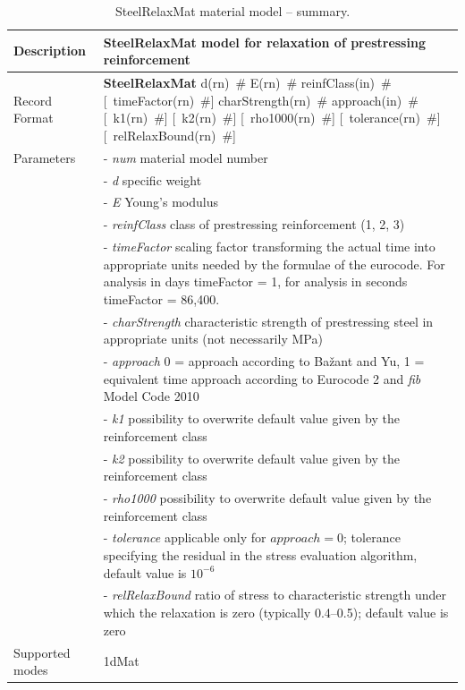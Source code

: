 \documentclass[a4paper]{article}
\newcommand{\descitem}[1]{{\noindent \bf #1}}
\newcommand{\elemparam}[2]{{{#1\tiny (#2)}~\#}}
\newcommand{\optelemparam}[2]{[{~\elemparam{#1}{#2}}]}
\newcommand{\param}[1]{{\it #1}}
\newenvironment{mmt}{\begin{tabular}{|l|p{9cm}|}}{\end{tabular}\\}
\newenvironment{mmt}{\begin{tabular}{|l|l|}}{\end{tabular}\\}
\begin{document}
\begin{table}[!htb]
\begin{mmt}
\hline
Description & SteelRelaxMat model for relaxation of prestressing reinforcement\\
\hline
Record Format & \descitem{SteelRelaxMat}  
\elemparam{d}{rn}
\elemparam{E}{rn}
\elemparam{reinfClass}{in}
\optelemparam{timeFactor}{rn}
\elemparam{charStrength}{rn} 
\elemparam{approach}{in} 
\optelemparam{k1}{rn}
\optelemparam{k2}{rn}
\optelemparam{rho1000}{rn}
\optelemparam{tolerance}{rn}
\optelemparam{relRelaxBound}{rn}\\
Parameters &- \param{num} material model number\\
&- \param{d} specific weight\\
&- \param{E} Young's modulus \\
&- \param{reinfClass} class of prestressing reinforcement (1, 2, 3) \\
&- \param{timeFactor} scaling factor transforming the actual time into
appropriate units needed by the formulae of the eurocode. For analysis
in days timeFactor = 1, for analysis in seconds timeFactor = 86,400.\\
&- \param{charStrength} characteristic strength of prestressing steel
in appropriate units (not necessarily MPa)\\
&- \param{approach} 0 = approach according to Ba\v{z}ant and Yu, 1 =
equivalent time approach according to Eurocode 2 and {\sl{fib}} Model Code 2010 \\
&- \param{k1} possibility to overwrite default value given by the
reinforcement class\\
&- \param{k2} possibility to overwrite default value given by the
reinforcement class\\
&- \param{rho1000} possibility to overwrite default value given by the
reinforcement class\\
&- \param{tolerance} applicable only for $approach = 0$; tolerance
specifying the residual in the stress evaluation algorithm, default
value is $10^{-6}$\\
&- \param{relRelaxBound} ratio of stress to characteristic strength
under which the relaxation is zero (typically 0.4--0.5); default
value is zero\\


Supported modes& 1dMat\\
\hline
\end{mmt}
\caption{SteelRelaxMat material model -- summary.}
\label{steelRelax_table}
\end{table}
\end{document}
